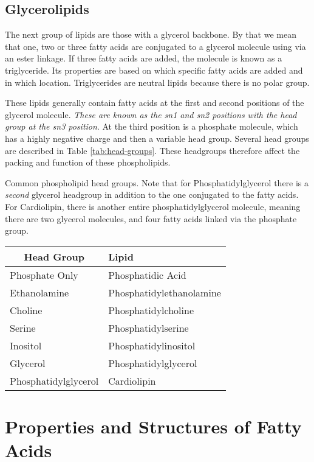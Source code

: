 \documentclass{tufte-handout}
\begin{document}
\subsection{Glycerolipids}

The next group of lipids are those with a glycerol backbone.  By that we mean that one, two or three fatty acids are conjugated to a glycerol molecule using via an ester linkage.  If three fatty acids are added, the molecule is known as a triglyceride. Its properties are based on which specific fatty acids are added and in which location.  Triglycerides are neutral lipids because there is no polar group.

  These lipids generally contain fatty acids at the first and second positions of the glycerol molecule.  \emph{These are known as the sn1 and sn2 positions with the head group at the sn3 position}.  At the third position is a phosphate molecule, which has a highly negative charge and then a variable head group.  Several head groups are described in Table \ref{tab:head-groups}.  These headgroups therefore affect the packing and function of these phospholipids.  

\begin{margintable}
\centering
\caption{Common phospholipid head groups.  Note that for Phosphatidylglycerol there is a \emph{second} glycerol headgroup in addition to the one conjugated to the fatty acids.  For Cardiolipin, there is another entire phosphatidylglycerol molecule, meaning there are two glycerol molecules, and four fatty acids linked via the phosphate group.}
\label{tab:head-groups}
\begin{tabular}{ll}
\hline
\multicolumn{1}{c}{\textbf{Head Group}} & \textbf{Lipid} \\ \hline
Phosphate Only          & Phosphatidic Acid      \\
Ethanolamine           & Phosphatidylethanolamine           \\
Choline           & Phosphatidylcholine          \\
Serine        & Phosphatidylserine \\
Inositol & Phosphatidylinositol \\
Glycerol & Phosphatidylglycerol \\
Phosphatidylglycerol & Cardiolipin     
\end{tabular}
\end{margintable}

\section{Properties and Structures of Fatty Acids}
\end{document}
